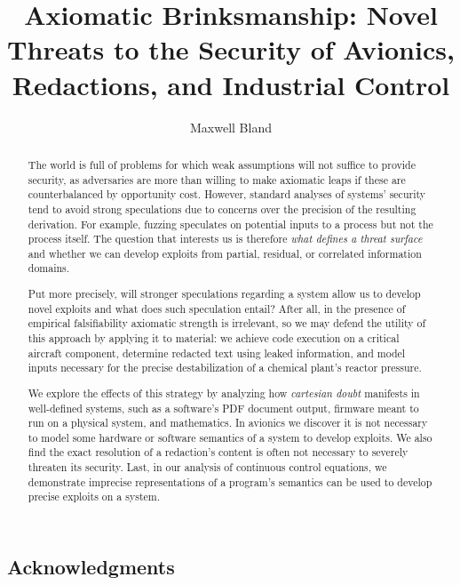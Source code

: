 \documentclass[
    11pt,
    edeposit,
    forcebottom]{uiucthesis2020}
\title{Axiomatic Brinksmanship: Novel Threats to the Security of Avionics, Redactions, and Industrial Control}
\author{Maxwell Bland}
\begin{document}
\maketitle


\begin{frontmatter}

\begin{abstract}
The world is full of problems for which weak assumptions will not suffice to provide security, as adversaries are more than willing to make axiomatic leaps if these are counterbalanced by opportunity cost.
However, standard analyses of systems' security tend to avoid strong speculations due to concerns over the precision of the resulting derivation.
For example, fuzzing speculates on potential inputs to a process but not the process itself.
The question that interests us is therefore \emph{what defines a threat surface} and whether we can develop exploits from partial, residual, or correlated information domains.

Put more precisely, will stronger speculations regarding a system allow us to develop novel exploits and what does such speculation entail?
After all, in the presence of empirical falsifiability axiomatic strength is irrelevant, so we may defend the utility of this approach by applying it to material: we achieve code execution on a critical aircraft component, determine redacted text using leaked information, and model inputs necessary for the precise destabilization of a chemical plant's reactor pressure.

We explore the effects of this strategy by analyzing how \emph{cartesian doubt} manifests in well-defined systems, such as a software's PDF document output, firmware meant to run on a physical system, and mathematics.
In avionics we discover it is not necessary to model some hardware or software semantics of a system to develop exploits.
We also find the exact resolution of a redaction's content is often not necessary to severely threaten its security.
Last, in our analysis of continuous control equations, we demonstrate imprecise representations of a program's semantics can be used to develop precise exploits on a system.
\end{abstract}

\chapter*{Acknowledgments}


\end{frontmatter}
\end{document}
